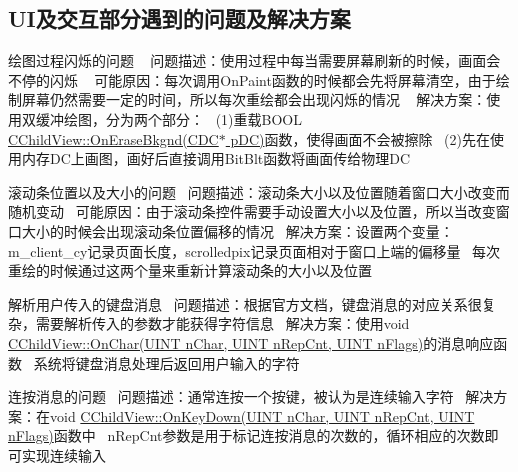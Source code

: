 \subsection*{U\+I及交互部分遇到的问题及解决方案 }


\begin{DoxyEnumerate}
\item 绘图过程闪烁的问题 ~\newline
问题描述：使用过程中每当需要屏幕刷新的时候，画面会不停的闪烁 ~\newline
可能原因：每次调用\+On\+Paint函数的时候都会先将屏幕清空，由于绘制屏幕仍然需要一定的时间，所以每次重绘都会出现闪烁的情况 ~\newline
解决方案：使用双缓冲绘图，分为两个部分：~\newline
(1)重载{\ttfamily B\+O\+OL \hyperlink{class_c_child_view_a6060e6d09d522d345dcee5a01d41c1f0}{C\+Child\+View\+::\+On\+Erase\+Bkgnd(\+C\+D\+C$\ast$ p\+D\+C)}}函数，使得画面不会被擦除~\newline
(2)先在使用内存\+D\+C上画图，画好后直接调用{\ttfamily Bit\+Blt}函数将画面传给物理\+DC~\newline

\item 滚动条位置以及大小的问题~\newline
问题描述：滚动条大小以及位置随着窗口大小改变而随机变动~\newline
可能原因：由于滚动条控件需要手动设置大小以及位置，所以当改变窗口大小的时候会出现滚动条位置偏移的情况~\newline
解决方案：设置两个变量：{\ttfamily m\+\_\+client\+\_\+cy}记录页面长度，{\ttfamily scrolledpix}记录页面相对于窗口上端的偏移量~\newline
每次重绘的时候通过这两个量来重新计算滚动条的大小以及位置~\newline

\item 解析用户传入的键盘消息~\newline
问题描述：根据官方文档，键盘消息的对应关系很复杂，需要解析传入的参数才能获得字符信息~\newline
解决方案：使用{\ttfamily void \hyperlink{class_c_child_view_af29ede94259b52b2ad54d139ff554abe}{C\+Child\+View\+::\+On\+Char(\+U\+I\+N\+T n\+Char, U\+I\+N\+T n\+Rep\+Cnt, U\+I\+N\+T n\+Flags)}}的消息响应函数~\newline
系统将键盘消息处理后返回用户输入的字符~\newline

\item 连按消息的问题~\newline
问题描述：通常连按一个按键，被认为是连续输入字符~\newline
解决方案：在{\ttfamily void \hyperlink{class_c_child_view_a74d87512b76128e2eedea87811363e45}{C\+Child\+View\+::\+On\+Key\+Down(\+U\+I\+N\+T n\+Char, U\+I\+N\+T n\+Rep\+Cnt, U\+I\+N\+T n\+Flags)}}函数中~\newline
{\ttfamily n\+Rep\+Cnt}参数是用于标记连按消息的次数的，循环相应的次数即可实现连续输入~\newline


\end{DoxyEnumerate}
